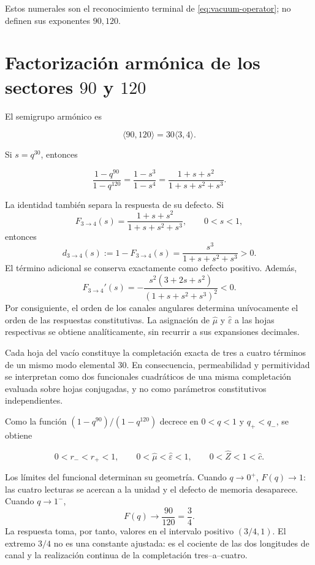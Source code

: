 Estos numerales son el reconocimiento terminal de \cref{eq:vacuum-operator}; no definen sus exponentes \(90,120\).

\section{Factorizaci\'on arm\'onica de los sectores \(90\) y \(120\)}

El semigrupo arm\'onico es

\[
\langle90,120\rangle=30\langle3,4\rangle.
\]

Si \(s=q^{30}\), entonces

\begin{equation}
\frac{1-q^{90}}{1-q^{120}}
=\frac{1-s^3}{1-s^4}
=\frac{1+s+s^2}{1+s+s^2+s^3}.
\label{eq:three-four-completion}
\end{equation}

La identidad tambi\'en separa la respuesta de su defecto. Si
\[
F_{3\to4}(s)=\frac{1+s+s^2}{1+s+s^2+s^3},
\qquad 0<s<1,
\]
entonces
\begin{equation}
d_{3\to4}(s):=1-F_{3\to4}(s)
=\frac{s^3}{1+s+s^2+s^3}>0.
\label{eq:vacuum-defect34}
\end{equation}
El t\'ermino adicional se conserva exactamente como defecto
positivo. Adem\'as,
\begin{equation}
F_{3\to4}'(s)
=-\frac{s^2(3+2s+s^2)}{(1+s+s^2+s^3)^2}<0.
\label{eq:vacuum-monotonic34}
\end{equation}
Por consiguiente, el orden de los canales angulares determina un\'ivocamente
el orden de las respuestas constitutivas. La asignaci\'on de
\(\widehat\mu\) y \(\widehat\varepsilon\) a las hojas respectivas se obtiene
anal\'iticamente, sin recurrir a sus expansiones decimales.

Cada hoja del vac\'io constituye la completaci\'on exacta de tres a cuatro
t\'erminos de un mismo modo elemental \(30\). En consecuencia, permeabilidad
y permitividad se interpretan como dos funcionales cuadr\'aticos de una misma
completaci\'on evaluada sobre hojas conjugadas, y no como par\'ametros
constitutivos independientes.

Como la funci\'on \((1-q^{90})/(1-q^{120})\) decrece en \(0<q<1\) y \(q_+<q_-\), se obtiene

\[
0<r_-<r_+<1,\qquad
0<\widehat\mu<\widehat\varepsilon<1,\qquad
0<\widehat Z<1<\widehat c.
\]

Los l\'imites del funcional determinan su geometr\'ia. Cuando \(q\to0^+\),
\(F(q)\to1\): las cuatro lecturas se acercan a la unidad y el defecto de
memoria desaparece. Cuando \(q\to1^-\),
\[
F(q)\longrightarrow\frac{90}{120}=\frac34.
\]
La respuesta toma, por tanto, valores en el intervalo positivo \((3/4,1)\). El
extremo \(3/4\) no es una constante ajustada: es el cociente de las dos
longitudes de canal y la realizaci\'on continua de la completaci\'on
tres--a--cuatro.

